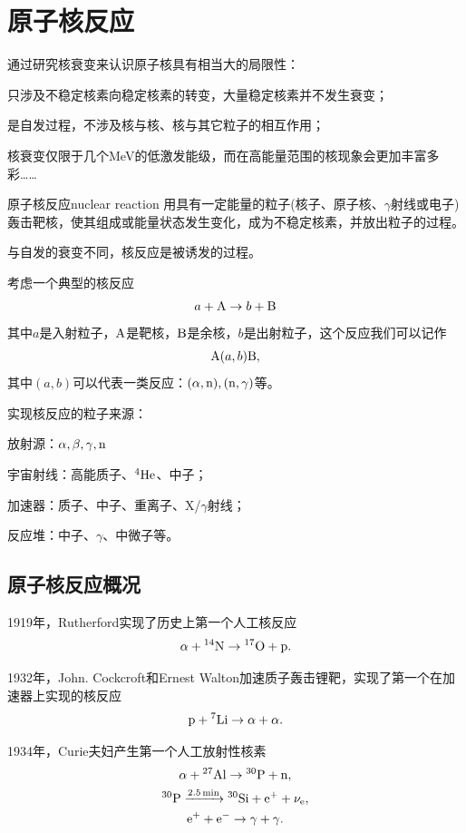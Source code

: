 \chapter{原子核反应}
通过研究核衰变来认识原子核具有相当大的局限性：
\begin{compactitem}
	\item 只涉及不稳定核素向稳定核素的转变，大量稳定核素并不发生衰变；
	\item 是自发过程，不涉及核与核、核与其它粒子的相互作用；
	\item 核衰变仅限于几个MeV的低激发能级，而在高能量范围的核现象会更加丰富多彩……
\end{compactitem} 

\begin{definition}{原子核反应}{nuclear reaction}
	用具有一定能量的粒子(核子、原子核、$\gamma$射线或电子)轰击靶核，使其组成或能量状态发生变化，成为不稳定核素，并放出粒子的过程。
\end{definition}
与自发的衰变不同，核反应是被诱发的过程。

考虑一个典型的核反应
\begin{align}\label{AabB}
	a+\mathrm{A}\to b+\mathrm{B}
\end{align}
其中$a$是入射粒子，$\mathrm{A}$是靶核，$\mathrm{B}$是余核，$b$是出射粒子，这个反应我们可以记作
\[
	{\mathrm{A}}(a,b){\mathrm{B}},
\]
其中$(a,b)$可以代表一类反应：$(\alpha,\mathrm n),(\mathrm n,\gamma)$等。

实现核反应的粒子来源：
\begin{compactitem}
	\item 放射源：$\alpha,\beta,\gamma,\mathrm n$
	\item 宇宙射线：高能质子、${^{4}\mathrm{He}}$、中子；
	\item 加速器：质子、中子、重离子、X/$\gamma$射线；
	\item 反应堆：中子、$\gamma$、中微子等。
\end{compactitem}
\section{原子核反应概况}
1919年，Rutherford实现了历史上第一个人工核反应
\[
	\alpha+{^{14}\mathrm{N}}\to{^{17}\mathrm{O}}+\mathrm p.
\]

1932年，John. Cockcroft和Ernest Walton加速质子轰击锂靶，实现了第一个在加速器上实现的核反应
\[
	\mathrm p+{^{7}\mathrm{Li}}\to\alpha+\alpha.
\]

1934年，Curie夫妇产生第一个人工放射性核素
\begin{gather*}
	\alpha+{^{27}\mathrm{Al}}\to{^{30}\mathrm{P}}+\mathrm n,\\
	{^{30}\mathrm{P}}\xrightarrow[]{\SI{2.5}{min}}{^{30}\mathrm{Si}}+\mathrm e^++\nu_\mathrm e,\\
	\mathrm e^++\mathrm e^-\to\gamma+\gamma.
\end{gather*}

